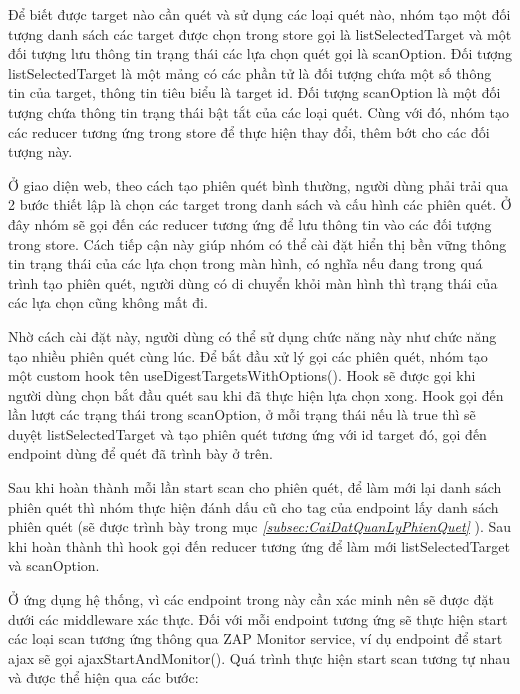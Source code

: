 Để biết được target nào cần quét và sử dụng các loại quét nào, nhóm tạo một đối tượng danh sách các target được chọn trong store gọi là listSelectedTarget và một đối tượng lưu thông tin trạng thái các lựa chọn quét gọi là scanOption. Đối tượng listSelectedTarget là một mảng có các phần tử là đối tượng chứa một số thông tin của target, thông tin tiêu biểu là target id. Đối tượng scanOption là một đối tượng chứa thông tin trạng thái bật tắt của các loại quét. Cùng với đó, nhóm tạo các reducer tương ứng trong store để thực hiện thay đổi, thêm bớt cho các đối tượng này.

Ở giao diện web, theo cách tạo phiên quét bình thường, người dùng phải trải qua 2 bước thiết lập là chọn các target trong danh sách và cấu hình các phiên quét.
Ở đây nhóm sẽ gọi đến các reducer tương ứng để lưu thông tin vào các đối tượng trong store. Cách tiếp cận này giúp nhóm có thể cài đặt hiển thị bền vững thông tin trạng thái của các lựa chọn trong màn hình, có nghĩa nếu đang trong quá trình tạo phiên quét, người dùng có di chuyển khỏi màn hình thì trạng thái của các lựa chọn cũng không mất đi.

Nhờ cách cài đặt này, người dùng có thể sử dụng chức năng này như chức năng tạo nhiều phiên quét cùng lúc.
Để bắt đầu xử lý gọi các phiên quét, nhóm tạo một custom hook tên useDigestTargetsWithOptions().
Hook sẽ được gọi khi người dùng chọn bắt đầu quét sau khi đã thực hiện lựa chọn xong.
Hook gọi đến lần lượt các trạng thái trong scanOption, ở mỗi trạng thái nếu là true thì sẽ duyệt listSelectedTarget và tạo phiên quét tương ứng với id target đó, gọi đến endpoint dùng để quét đã trình bày ở trên.

Sau khi hoàn thành mỗi lần start scan cho phiên quét, để làm mới lại danh sách phiên quét thì nhóm thực hiện đánh dấu cũ cho tag của endpoint lấy danh sách phiên quét (sẽ được trình bày trong mục \textit{\ref{subsec:CaiDatQuanLyPhienQuet} }).
Sau khi hoàn thành thì hook gọi đến reducer tương ứng để làm mới listSelectedTarget và scanOption.

Ở ứng dụng hệ thống, vì các endpoint trong này cần xác minh nên sẽ được đặt dưới các middleware xác thực.
Đối với mỗi endpoint tương ứng sẽ thực hiện start các loại scan tương ứng thông qua ZAP Monitor service, ví dụ endpoint để start ajax sẽ gọi ajaxStartAndMonitor().
Quá trình thực hiện start scan tương tự nhau và được thể hiện qua các bước:

